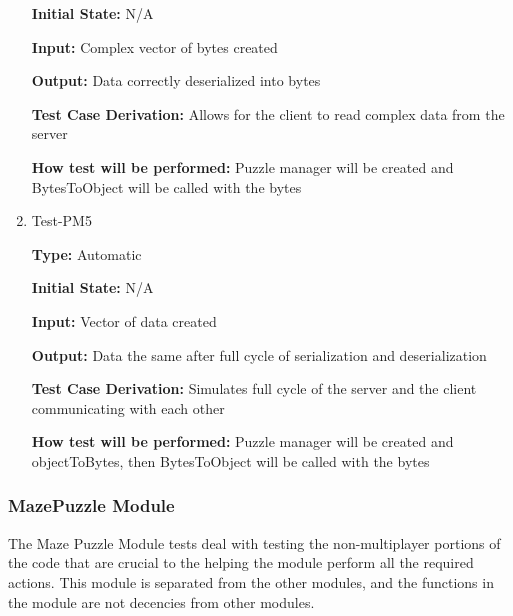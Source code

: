 \documentclass[12pt, titlepage]{article}
\begin{document}
\begin{enumerate}
 \textbf{Initial State:} N/A
					
 \textbf{Input:} Complex vector of bytes created
					
 \textbf{Output:} Data correctly deserialized into bytes

 \textbf{Test Case Derivation:} Allows for the client to read complex data from the server

 \textbf{How test will be performed:} Puzzle manager will be created and BytesToObject will be called with the bytes

 \item{Test-PM5\\}

 \textbf{Type:} Automatic
					
 \textbf{Initial State:} N/A
					
 \textbf{Input:} Vector of data created
					
 \textbf{Output:} Data the same after full cycle of serialization and deserialization

 \textbf{Test Case Derivation:} Simulates full cycle of the server and the client communicating with each other

 \textbf{How test will be performed:} Puzzle manager will be created and objectToBytes, then BytesToObject will be called with the bytes
 
 \end{enumerate}

 \subsubsection{MazePuzzle Module}
The Maze Puzzle Module tests deal with testing the non-multiplayer portions of the code that are crucial to the helping the module perform all the required actions. This module is separated from the other modules, and the functions in the module are not decencies from other modules.
\end{document}
